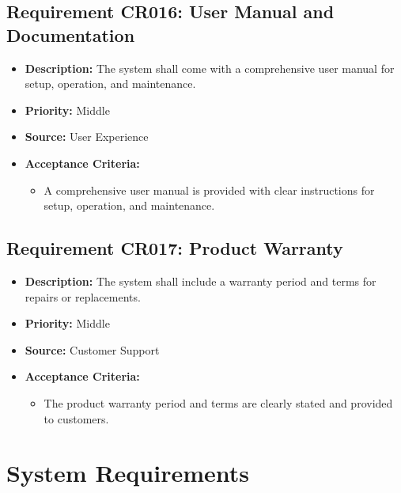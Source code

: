 \documentclass{article}
\begin{document}
	\subsection{Requirement CR016: User Manual and Documentation}
	\begin{itemize}
		\item \textbf{Description:} The system shall come with a comprehensive user manual for setup, operation, and maintenance.
		\item \textbf{Priority:} Middle
		\item \textbf{Source:} User Experience
		\item \textbf{Acceptance Criteria:}
		\begin{itemize}
			\item A comprehensive user manual is provided with clear instructions for setup, operation, and maintenance.
		\end{itemize}
	\end{itemize}
	
	\subsection{Requirement CR017: Product Warranty}
	\begin{itemize}
		\item \textbf{Description:} The system shall include a warranty period and terms for repairs or replacements.
		\item \textbf{Priority:} Middle
		\item \textbf{Source:} Customer Support
		\item \textbf{Acceptance Criteria:}
		\begin{itemize}
			\item The product warranty period and terms are clearly stated and provided to customers.
		\end{itemize}
	\end{itemize}

	\newpage

	\section{System Requirements}	
	
\end{document}
